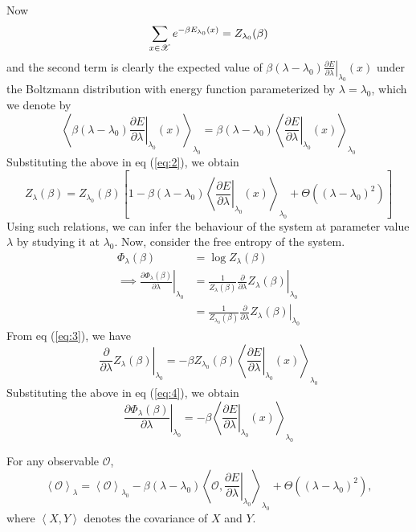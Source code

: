 \documentclass[letterpaper,english,12pt]{article}
\begin{document}
Now
$$\sum_{x \in \mathscr{X}} e^{-\beta E_{\lambda_0}(x)} = Z_{\lambda_0}(\beta)$$
and the second term is clearly the expected value of $\beta (\lambda - \lambda_0) \left. \frac{\partial E}{\partial \lambda} \right|_{\lambda_0}(x)$ under the Boltzmann distribution with energy function parameterized by $\lambda = \lambda_0$, which we denote by
$$ \left\langle \beta (\lambda - \lambda_0) \left. \frac{\partial E}{\partial \lambda} \right|_{\lambda_0}(x) \right\rangle_{\lambda_0} = \beta (\lambda - \lambda_0) \left\langle \left. \frac{\partial E}{\partial \lambda} \right|_{\lambda_0}(x) \right\rangle_{\lambda_0}$$
Substituting the above in eq (\ref{eq:2}), we obtain
\begin{equation}
Z_\lambda(\beta) = Z_{\lambda_0}(\beta) \left[ 1 - \beta (\lambda - \lambda_0) \left\langle \left. \frac{\partial E}{\partial \lambda} \right|_{\lambda_0}(x) \right\rangle_{\lambda_0} + \Theta((\lambda - \lambda_0)^2) \right] \label{eq:3}
\end{equation}
Using such relations, we can infer the behaviour of the system at parameter value $\lambda$ by studying it at $\lambda_0$. Now, consider the free entropy of the system.
\begin{align}
\Phi_\lambda(\beta) &= \log Z_\lambda (\beta) \nonumber \\
\implies \left. \frac{\partial \Phi_\lambda(\beta)}{\partial \lambda} \right|_{\lambda_0} &= \left. \frac{1}{Z_\lambda (\beta)} \frac{\partial}{\partial \lambda} Z_\lambda (\beta) \right|_{\lambda_0} \nonumber \\
&= \frac{1}{Z_{\lambda_0} (\beta)} \left. \frac{\partial}{\partial \lambda} Z_\lambda (\beta) \right|_{\lambda_0} \label{eq:4}
\end{align}
From eq (\ref{eq:3}), we have
$$\left. \frac{\partial}{\partial \lambda} Z_\lambda (\beta) \right|_{\lambda_0} = -\beta Z_{\lambda_0}(\beta) \left\langle \left. \frac{\partial E}{\partial \lambda} \right|_{\lambda_0}(x) \right\rangle_{\lambda_0}$$
Substituting the above in eq (\ref{eq:4}), we obtain
\begin{equation}
\left. \frac{\partial \Phi_\lambda(\beta)}{\partial \lambda} \right|_{\lambda_0} = -\beta \left\langle \left. \frac{\partial E}{\partial \lambda} \right|_{\lambda_0}(x) \right\rangle_{\lambda_0}
\end{equation}
\begin{thm}
For any observable $\mathcal{O}$,
\begin{equation}
\left\langle \mathcal{O} \right\rangle_{\lambda} = \left\langle \mathcal{O} \right\rangle_{\lambda_0} - \beta (\lambda - \lambda_0) \left\langle \mathcal{O}, \left. \frac{\partial E}{\partial \lambda} \right|_{\lambda_0} \right\rangle_{\lambda_0} + \Theta((\lambda - \lambda_0)^2),
\end{equation}
where $\left\langle X, Y \right\rangle$ denotes the covariance of $X$ and $Y$.
\end{thm}
\end{document}
